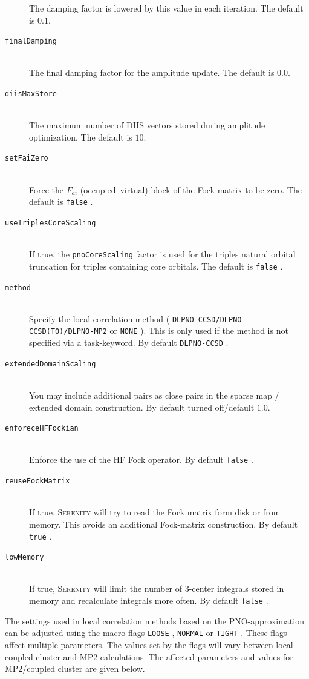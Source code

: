 \documentclass[bibliography=totocnumbered,a4paper,10pt,oneside]{scrbook}
\newcommand{\ttt}[1]{%
  \begingroup\setlength{\fboxsep}{1pt}%
  \colorbox{serenity-green!30}{\texttt{\hspace*{2pt}\vphantom{(g}#1\hspace*{2pt}}}%
  \endgroup
}
\begin{document}
\begin{description}
    The damping factor is lowered by this value in each iteration. The default is $0.1$.
    \item [\texttt{finalDamping}]\hfill \\
    The final damping factor for the amplitude update. The default is $0.0$.
    \item [\texttt{diisMaxStore}]\hfill \\
    The maximum number of DIIS vectors stored during amplitude optimization. The default is $10$.
    \item [\texttt{setFaiZero}]\hfill \\
    Force the $F_{ai}$ (occupied--virtual) block of the Fock matrix to be zero. The default is \ttt{false}.
    \item [\texttt{useTriplesCoreScaling}]\hfill \\
    If true, the \texttt{pnoCoreScaling} factor is used for the triples natural orbital truncation for
    triples containing core orbitals. The default is \ttt{false}.
    \item [\texttt{method}]\hfill \\
    Specify the local-correlation method (\ttt{DLPNO-CCSD/DLPNO-CCSD(T0)/DLPNO-MP2} or \ttt{NONE}). This is only used if the method
    is not specified via a task-keyword. By default \ttt{DLPNO-CCSD}.
    \item [\texttt{extendedDomainScaling}]\hfill \\
    You may include additional pairs as close pairs in the sparse map / extended
    domain construction. By default turned off/default $1.0$.
    \item [\texttt{enforeceHFFockian}]\hfill \\
    Enforce the use of the HF Fock operator. By default \ttt{false}.
    \item [\texttt{reuseFockMatrix}]\hfill \\
    If true, \textsc{Serenity} will try to read the Fock matrix form disk or from memory.
    This avoids an additional Fock-matrix construction. By default \ttt{true}.
    \item [\texttt{lowMemory}]\hfill \\
    If true, \textsc{Serenity} will limit the number of 3-center integrals stored in memory
    and recalculate integrals more often. By default \ttt{false}.
 \end{description}

The settings used in local correlation methods based on the PNO-approximation can
be adjusted using the macro-flags \ttt{LOOSE}, \ttt{NORMAL} or \ttt{TIGHT}.
These flags affect multiple parameters. The values set by the flags will vary between
local coupled cluster and MP2 calculations. The affected parameters and values for
MP2/coupled cluster are given below.
\end{document}
